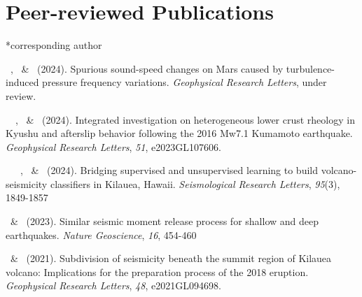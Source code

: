 \section{Peer-reviewed Publications}
\newcommand{\Revision}{\emph{under revision}}
\newcommand{\CS}{*} %

\CS corresponding author
\begin{etaremune}
\item \Me\, \ZLi\CS, \XHan\ \& \RYuan\ (2024).
    Spurious sound-speed changes on Mars caused by turbulence-induced pressure frequency variations.
    \emph{Geophysical Research Letters}, under review.
\item \YLiu\, \Me\, \YHu\CS, \JZhang\ \& \YChen\ (2024).
   Integrated investigation on heterogeneous lower crust rheology in Kyushu and afterslip behavior following the 2016 Mw7.1 Kumamoto earthquake.
    \emph{Geophysical Research Letters}, \emph{51}, e2023GL107606.
\item \Me\, \YHu\, \SMa\, \ZLi\CS, \GLiu\ \& \HHuang\ (2024).
    Bridging supervised and unsupervised learning to build volcano-seismicity classifiers in Kilauea, Hawaii.
    \emph{Seismological Research Letters}, \emph{95}(3), 1849-1857
\item \Me\, \ZLi\CS \& \YHu\ (2023).
    Similar seismic moment release process for shallow and deep earthquakes.
    \emph{Nature Geoscience}, \emph{16}, 454-460
\item \Me\, \ZLi\CS \& \HHuang\ (2021).
    Subdivision of seismicity beneath the summit region of Kilauea volcano: Implications for the preparation process of the 2018 eruption.
    \emph{Geophysical Research Letters}, \emph{48}, e2021GL094698.
\end{etaremune}